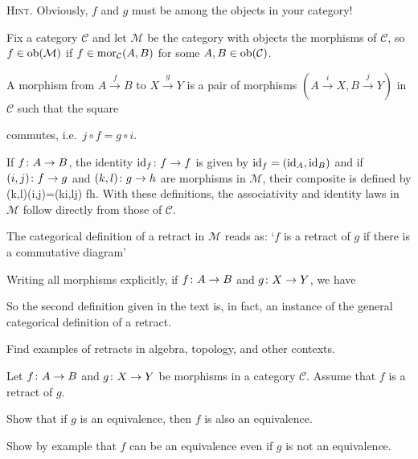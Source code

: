 {\scshape Hint}. Obviously, $f$ and $g$ must be among the objects in your category!
\ex

\bs
Fix a category $\mathcal{C}$ and let $\mathcal{M}$ be the category with objects the morphisms of $\mathcal{C}$, so $f\in \operatorname{ob}(\mathcal{M})$ if $f\in \operatorname{mor}_{\mathcal{C}}(A,B)$ for some $A,B\in \operatorname{ob}(\mathcal{C})$.

A morphism from $A\xrightarrow{f}B$ to $X\xrightarrow{g}Y$ is a pair of morphisms $(A\xrightarrow{i}X,B\xrightarrow{j}Y)$ in $\mathcal{C}$ such that the square
\bse
{}
\ese
commutes, i.e.\ $j\circ f=g\circ i$.

If $f\colon A\to B$, the identity $\mathrm{id}_f\colon f\to f$ is given by $\mathrm{id}_f=(\mathrm{id}_A,\mathrm{id}_B)$ and if $(i,j)\colon f\to g$ and $(k,l)\colon g\to h$ are morphisms in $\mathcal{M}$, their composite is defined by
\bse
(k,l)\circ (i,j)=(k\circ i,l\circ j) \cl f\to h.
\ese
With these definitions, the associativity and identity laws in $\mathcal{M}$ follow directly from those of $\mathcal{C}$.

The categorical definition of a retract in $\mathcal{M}$ reads as: `$f$ is a retract of $g$ if there is a commutative diagram'
\bse
{}
\ese
Writing all morphisms explicitly, if $f\colon A\to B$ and $g\colon X\to Y$, we have
\bse
{}
\ese
So the second definition given in the text is, in fact, an instance of the general categorical definition of a retract.
\es

\bx
Find examples of retracts in algebra, topology, and other contexts.
\ex

\bs
\es

\bp
Let $f \colon A \to B$ and $g \colon X \to Y$ be morphisms in a category $\mathcal{C}$. Assume that $f$ is a retract of $g$.
\ben[label=(\alph*)]
\item Show that if $g$ is an equivalence, then $f$ is also an equivalence.
\item Show by example that $f$ can be an equivalence even if $g$ is not an equivalence.
\een
\ep

